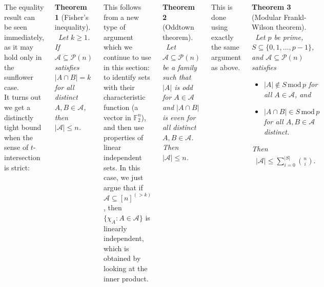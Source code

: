 \documentclass{tikzposter} %
\newcommand{\mc}{\mathcal}
\newtheorem{theorem}{Theorem}
\begin{document}
\begin{columns}
{    The equality result can be seen immediately, as it may hold only in the sunflower case. \\

    It turns out we get a distinctly tight bound when the sense of $t$-intersection is strict:
      \begin{theorem}[Fisher's inequality]
      \ Let $k \ge 1$. If $\mc{A} \subseteq \mc{P}(n)$ satisfies $|A \cap B| = k$ for all distinct $A, B \in \mc{A}$, then $|\mc{A}| \le n$.
      \end{theorem}
      \hphantom{}

      This follows from a new type of argument which we continue to use in this section: to identify sets with their characteristic function (a vector in $\mathbb{F}_2^n$), and then use properties of linear independent sets. In this case, we just argue that if $\mc{A} \subseteq [n]^{(> k)}$, then $\{\chi_A : A \in \mc{A}\}$ is linearly independent, which is obtained by looking at the inner product. \\

      \begin{theorem}[Oddtown theorem]
      \ Let $\mc{A} \subseteq \mc{P}(n)$ be a family such that $|A|$ is odd for $A \in \mc{A}$ and $|A \cap B|$ is even for all distinct $A, B \in \mc{A}$. Then $|\mc{A}| \le n$.
      \end{theorem}
      \hphantom{}

      This is done using exactly the same argument as above.\\

      \begin{theorem}[Modular Frankl-Wilson theorem]
        \ Let $p$ be prime, $S \subseteq \{0, 1, \dots, p-1\}$, and $\mc{A} \subseteq \mc{P}(n)$ satisfies
        \begin{itemize}
          \item $|A| \notin S \,\mathrm{mod}\, p$ for all $A \in \mc{A}$, and
          \item $|A \cap B| \in S \,\mathrm{mod}\, p$ for all $A, B \in \mc{A}$ distinct.
        \end{itemize}
        Then
        \begin{align*}
          |\mc{A}| \le \sum_{i=0}^{|S|} {n \choose i}.
        \end{align*}
      \end{theorem}

}
\end{columns}
\end{document}
